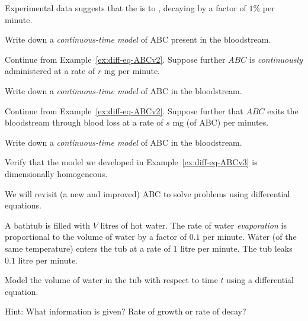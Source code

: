 \documentclass[../main.tex]{subfiles}
\begin{document}
\begin{example} \label{ex:diff-eq-ABCv1}
  Experimental data suggests that the  is  to , decaying by a factor of \(1\%\) per minute.

  Write down a \emph{continuous-time model} of ABC present in the bloodstream.
\end{example}

\begin{example} \label{ex:diff-eq-ABCv2}
  Continue from Example~\ref{ex:diff-eq-ABCv2}.  Suppose further \(ABC\) is \emph{continuously} administered at a rate of \(r\) mg per minute. 

  Write down a \emph{continuous-time model} of ABC in the bloodstream.
\end{example}

\begin{example} \label{ex:diff-eq-ABCv3}
  Continue from Example~\ref{ex:diff-eq-ABCv2}.  Suppose further that \(ABC\) exits the bloodstream through blood loss at a rate of \(s\) mg (of ABC) per minutes. 

  Write down a \emph{continuous-time model} of ABC in the bloodstream.
\end{example}

\begin{example}
  Verify that the model we developed in Example~\ref{ex:diff-eq-ABCv3} is dimensionally homogeneous.
\end{example}

We will revisit (a new and improved) ABC to solve problems using differential equations.
\clearpage

\begin{example}
  A bathtub is filled with \(V\) litres of hot water. The rate of water \emph{evaporation} is proportional to the volume of water by a factor of \(0.1\) per minute.  Water (of the same temperature) enters the tub at a rate of \(1\) litre per minute. The tub leaks \(0.1\) litre per minute. 

  Model the volume of water in the tub with respect to time \(t\) using a differential equation.

  Hint: What information is given? Rate of growth or rate of decay?
\end{example}
\end{document}
